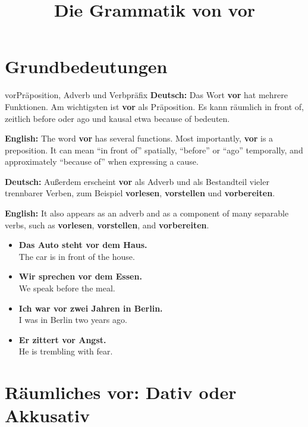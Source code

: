 \documentclass[a4paper,11pt]{article}
\title{Die Grammatik von \glqq vor\grqq}
\author{}
\date{}
\newcommand{\GermanText}[1]{\textbf{Deutsch: }#1\par}
\newcommand{\EnglishText}[1]{{\small\color{SoftGray}\textbf{English: }#1\par}}
\newcommand{\ExampleItem}[2]{\item \textbf{#1}\\{\small\color{SoftGray}#2}}
\begin{document}
    \maketitle
    \tableofcontents
    \newpage

    \section{Grundbedeutungen}

        \begin{grammarentry}{vor}{Präposition, Adverb und Verbpräfix}
            \GermanText{Das Wort \textbf{vor} hat mehrere Funktionen. Am wichtigsten ist \textbf{vor} als Präposition. Es kann räumlich \glqq in front of\grqq, zeitlich \glqq before\grqq{} oder \glqq ago\grqq{} und kausal etwa \glqq because of\grqq{} bedeuten.}
            \EnglishText{The word \textbf{vor} has several functions. Most importantly, \textbf{vor} is a preposition. It can mean ``in front of'' spatially, ``before'' or ``ago'' temporally, and approximately ``because of'' when expressing a cause.}

            \GermanText{Außerdem erscheint \textbf{vor} als Adverb und als Bestandteil vieler trennbarer Verben, zum Beispiel \textbf{vorlesen}, \textbf{vorstellen} und \textbf{vorbereiten}.}
            \EnglishText{It also appears as an adverb and as a component of many separable verbs, such as \textbf{vorlesen}, \textbf{vorstellen}, and \textbf{vorbereiten}.}
        \end{grammarentry}

        \begin{exbox}
            \begin{itemize}
                \ExampleItem{Das Auto steht vor dem Haus.}{The car is in front of the house.}
                \ExampleItem{Wir sprechen vor dem Essen.}{We speak before the meal.}
                \ExampleItem{Ich war vor zwei Jahren in Berlin.}{I was in Berlin two years ago.}
                \ExampleItem{Er zittert vor Angst.}{He is trembling with fear.}
            \end{itemize}
        \end{exbox}


    \section{Räumliches \glqq vor\grqq: Dativ oder Akkusativ}
\end{document}
